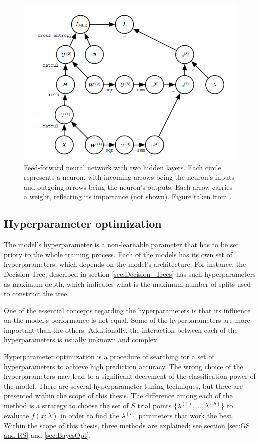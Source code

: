 \begin{figure}[!ht]
\centering
\includegraphics[scale=0.7]{figures/Comput_graph.PNG}
\caption{ Feed-forward neural network with two hidden layers.  Each circle represents a neuron, with incoming arrows being the neuron’s inputs and outgoing arrows being the neuron’s outputs. Each arrow carries a weight, reflecting its importance (not shown). Figure taken from \cite{DLBook}.
}
\label{fig:Comput_graph}
\end{figure} 

\subsection{Hyperparameter optimization}
\label{sec:hyperparameters}

The model's hyperparameter is a non-learnable parameter that has to be set priory to the whole training process. Each of the models has its own set of hyperparameters, which depends on the model's architecture. For instance, the Decision Tree, described in section \ref{sec:Decision_Trees} has such hyperparameters as maximum depth, which indicates what is the maximum number of splits used to construct the tree. 

One of the essential concepts regarding the hyperparameters is that its influence on the model's performance is not equal. Some of the hyperparameters are more important than the others. Additionally, the interaction between each of the hyperparameters is usually unknown and complex. 

Hyperparameter optimization is a procedure of searching for a set of hyperparameters to achieve high prediction accuracy. The wrong choice of the hyperparameters may lead to a significant decrement of the classification power of the model. There are several hyperparameter tuning techniques, but three are presented within the scope of this thesis. The difference among each of the method is a strategy to choose the set of $S$ trial points $\{\lambda^{(1)}, \ldots , \lambda^{(S)} \}$ to evaluate $f(x;\lambda)$ in order to find the $\lambda^{(i)}$ parameters that work the best. Within the scope of this thesis, three methods are explained; see section \ref{sec:GS and RS} and \ref{sec:BayesOpt}.  

